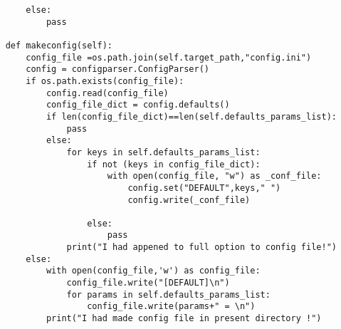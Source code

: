 \begin{verbatim}
        else:
            pass

    def makeconfig(self):
        config_file =os.path.join(self.target_path,"config.ini")
        config = configparser.ConfigParser()
        if os.path.exists(config_file):
            config.read(config_file)
            config_file_dict = config.defaults()
            if len(config_file_dict)==len(self.defaults_params_list):
                pass
            else:
                for keys in self.defaults_params_list:
                    if not (keys in config_file_dict):
                        with open(config_file, "w") as _conf_file: 
                            config.set("DEFAULT",keys," ")
                            config.write(_conf_file)
                            
                    else:
                        pass
                print("I had appened to full option to config file!")
        else:
            with open(config_file,'w') as config_file:
                config_file.write("[DEFAULT]\n")
                for params in self.defaults_params_list:
                    config_file.write(params+" = \n")
            print("I had made config file in present directory !")

\end{verbatim}

            

